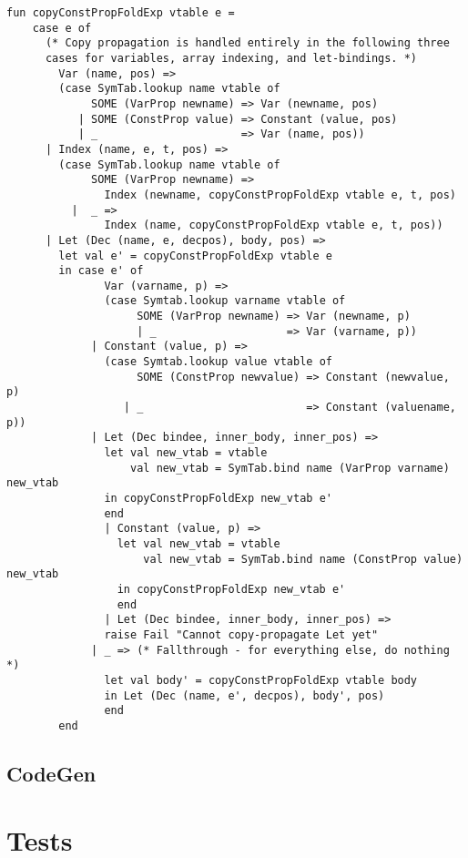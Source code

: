 \documentclass[a4paper]{article}
\begin{document}
\begin{lstlisting}
fun copyConstPropFoldExp vtable e =
    case e of
      (* Copy propagation is handled entirely in the following three
      cases for variables, array indexing, and let-bindings. *)
        Var (name, pos) =>
        (case SymTab.lookup name vtable of
             SOME (VarProp newname) => Var (newname, pos)
           | SOME (ConstProp value) => Constant (value, pos)
           | _                      => Var (name, pos))
      | Index (name, e, t, pos) =>
        (case SymTab.lookup name vtable of
             SOME (VarProp newname) =>
               Index (newname, copyConstPropFoldExp vtable e, t, pos)
          |  _ =>
               Index (name, copyConstPropFoldExp vtable e, t, pos))
      | Let (Dec (name, e, decpos), body, pos) =>
        let val e' = copyConstPropFoldExp vtable e
        in case e' of
               Var (varname, p) =>
               (case Symtab.lookup varname vtable of
                    SOME (VarProp newname) => Var (newname, p)
                    | _                    => Var (varname, p))
             | Constant (value, p) =>
               (case Symtab.lookup value vtable of
                    SOME (ConstProp newvalue) => Constant (newvalue, p)
                  | _                         => Constant (valuename, p))
             | Let (Dec bindee, inner_body, inner_pos) =>
               let val new_vtab = vtable
                   val new_vtab = SymTab.bind name (VarProp varname) new_vtab
               in copyConstPropFoldExp new_vtab e'
               end
               | Constant (value, p) =>
                 let val new_vtab = vtable
                     val new_vtab = SymTab.bind name (ConstProp value) new_vtab
                 in copyConstPropFoldExp new_vtab e'
                 end
               | Let (Dec bindee, inner_body, inner_pos) =>
               raise Fail "Cannot copy-propagate Let yet"
             | _ => (* Fallthrough - for everything else, do nothing *)
               let val body' = copyConstPropFoldExp vtable body
               in Let (Dec (name, e', decpos), body', pos)
               end
        end
\end{lstlisting}
\subsection{CodeGen}
\section{Tests}
\end{document}

